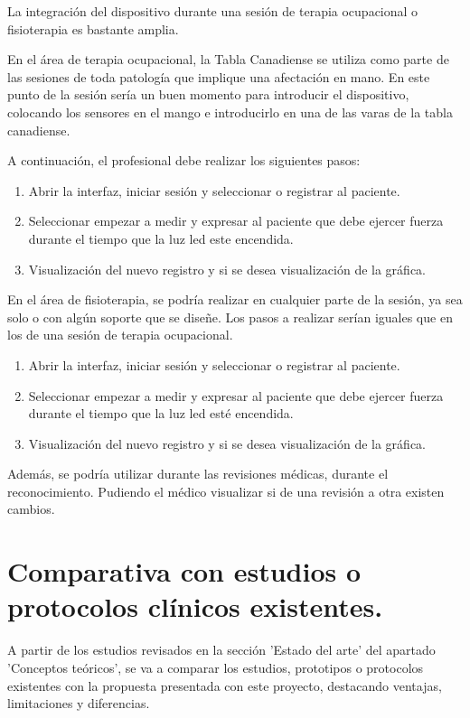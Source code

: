 La integración del dispositivo durante una sesión de terapia ocupacional o fisioterapia es bastante amplia.

En el área de terapia ocupacional, la Tabla Canadiense se utiliza como parte de las sesiones de toda patología que implique una afectación en mano. En este punto de la sesión sería un buen momento para introducir el dispositivo, colocando los sensores en el mango e introducirlo en una de las varas de la tabla canadiense. 

A continuación, el profesional debe realizar los siguientes pasos: 
\begin{enumerate}
    \item Abrir la interfaz, iniciar sesión y seleccionar o registrar al paciente.
    \item Seleccionar empezar a medir y expresar al paciente que debe ejercer fuerza durante el tiempo que la luz led este encendida.
    \item Visualización del nuevo registro y si se desea visualización de la gráfica. 
\end{enumerate}

En el área de fisioterapia, se podría realizar en cualquier parte de la sesión, ya sea solo o con algún soporte que se diseñe. Los pasos a realizar serían iguales que en los de una sesión de terapia ocupacional. 
\begin{enumerate}
    \item Abrir la interfaz, iniciar sesión y seleccionar o registrar al paciente.
    \item Seleccionar empezar a medir y expresar al paciente que debe ejercer fuerza durante el tiempo que la luz led esté encendida.
    \item Visualización del nuevo registro y si se desea visualización de la gráfica. 
\end{enumerate}

Además, se podría utilizar durante las revisiones médicas, durante el reconocimiento. Pudiendo el médico visualizar si de una revisión a otra existen cambios. 

\section{ Comparativa con estudios o protocolos clínicos existentes.}

A partir de los estudios revisados en la sección 'Estado del arte' del apartado 'Conceptos teóricos', se va a comparar los estudios, prototipos o protocolos existentes con la propuesta presentada con este proyecto, destacando ventajas, limitaciones y diferencias.

